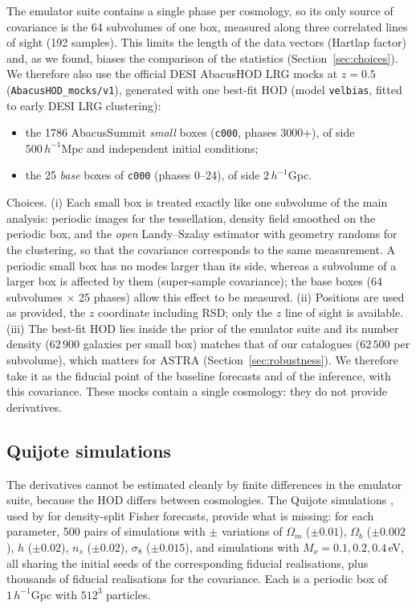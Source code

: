 \documentclass[11pt,twocolumn]{article}
\newcommand{\Mpch}{\,h^{-1}\mathrm{Mpc}}
\begin{document}
The emulator suite contains a single phase per cosmology, so its only source of covariance is the 64 subvolumes of one box, measured along three correlated lines of sight (192 samples). This limits the length of the data vectors (Hartlap factor) and, as we found, biases the comparison of the statistics (Section~\ref{sec:choices}). We therefore also use the official DESI AbacusHOD LRG mocks at $z=0.5$ \cite{Yuan2022} (\texttt{AbacusHOD\_mocks/v1}), generated with one best-fit HOD (model \texttt{velbias}, fitted to early DESI LRG clustering):
\begin{itemize}
\item the 1786 AbacusSummit \emph{small} boxes (\texttt{c000}, phases 3000+), of side $500\Mpch$ and independent initial conditions;
\item the 25 \emph{base} boxes of \texttt{c000} (phases 0--24), of side $2\,h^{-1}$Gpc.
\end{itemize}
Choices. (i) Each small box is treated exactly like one subvolume of the main analysis: periodic images for the tessellation, density field smoothed on the periodic box, and the \emph{open} Landy--Szalay estimator with geometry randoms for the clustering, so that the covariance corresponds to the same measurement. A periodic small box has no modes larger than its side, whereas a subvolume of a larger box is affected by them (super-sample covariance); the base boxes (64 subvolumes $\times$ 25 phases) allow this effect to be measured. (ii) Positions are used as provided, the $z$ coordinate including RSD; only the $z$ line of sight is available. (iii) The best-fit HOD lies inside the prior of the emulator suite and its number density ($62\,900$ galaxies per small box) matches that of our catalogues ($62\,500$ per subvolume), which matters for ASTRA (Section~\ref{sec:robustness}). We therefore take it as the fiducial point of the baseline forecasts and of the inference, with this covariance. These mocks contain a single cosmology: they do not provide derivatives.

\subsection{Quijote simulations}
\label{sec:quijote_sims}

The derivatives cannot be estimated cleanly by finite differences in the emulator suite, because the HOD differs between cosmologies. The Quijote simulations \cite{Quijote}, used by \cite{Paillas2023} for density-split Fisher forecasts, provide what is missing: for each parameter, 500 pairs of simulations with $\pm$ variations of $\Omega_m$ ($\pm0.01$), $\Omega_b$ ($\pm0.002$), $h$ ($\pm0.02$), $n_s$ ($\pm0.02$), $\sigma_8$ ($\pm0.015$), and simulations with $M_\nu = 0.1, 0.2, 0.4$\,eV, all sharing the initial seeds of the corresponding fiducial realisations, plus thousands of fiducial realisations for the covariance. Each is a periodic box of $1\,h^{-1}$Gpc with $512^3$ particles.
\end{document}
